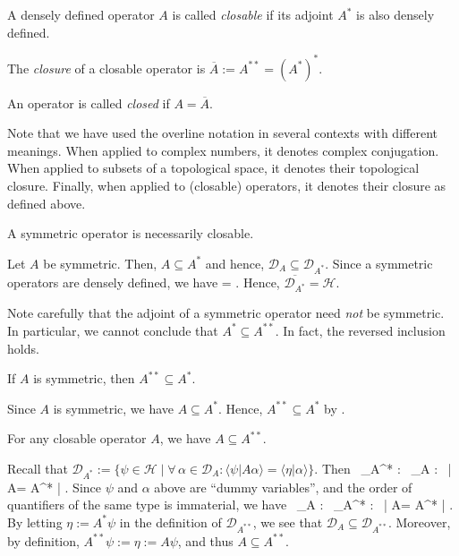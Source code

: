 \bd
\ben[label=(\roman*)]
\item A densely defined operator $A$ is called \emph{closable} if its adjoint $A^*$ is also densely defined.
\item The \emph{closure} of a closable operator is $\overline{A}:=A^{**}=(A^*)^*$.
\item An operator is called \emph{closed} if $A=\overline{A}$.
\een
\ed

\br
Note that we have used the overline notation in several contexts with different meanings. When applied to complex numbers, it denotes complex conjugation. When applied to subsets of a topological space, it denotes their topological closure. Finally, when applied to (closable) operators, it denotes their closure as defined above.
\er

\bp
A symmetric operator is necessarily closable.
\ep

\bq
Let $A$ be symmetric. Then, $A\subseteq A^*$ and hence, $\mathcal{D}_A\subseteq \mathcal{D}_{A^*}$. Since a symmetric operators are densely defined, we have
\bse
{}=\subseteq {} \subseteq {}.
\ese
Hence, $\overline{\mathcal{D}_{A^*}} = \mathcal{H}$.
\eq

Note carefully that the adjoint of a symmetric operator need \emph{not} be symmetric. In particular, we cannot conclude that $A^*\subseteq A^{**}$. In fact, the reversed inclusion holds.

\bp
If $A$ is symmetric, then $A^{**}\subseteq A^*$.
\ep

\bq
Since $A$ is symmetric, we have $A\subseteq A^*$. Hence, $A^{**}\subseteq A^*$ by .
\eq

\bl
\label{lem:closableext}
For any closable operator $A$, we have $A\subseteq A^{**}$.
\el

\bq
Recall that $\mathcal{D}_{A^*}:=\{\psi\in \mathcal{H}\mid \forall\, \alpha\in \mathcal{D}_{A} : \langle \psi | A\alpha \rangle=\langle \eta | \alpha \rangle\}$. Then
\bse
\forall \, \psi \in{}_{A^*} : \forall \, \alpha \in {}_{A} : \  \langle \psi | A\alpha \rangle =  \langle A^* \psi | \alpha \rangle.
\ese
Since $\psi$ and $\alpha$ above are ``dummy variables'', and the order of quantifiers of the same type is immaterial, we have
\bse
\forall \, \psi \in{}_{A} : \forall \, \alpha \in {}_{A^*} : \  \langle \alpha | A\psi \rangle =  \langle A^* \alpha | \psi \rangle.
\ese
By letting $\eta:=A^*\psi$ in the definition of $\mathcal{D}_{A^{**}}$, we see that $\mathcal{D}_{A}\subseteq\mathcal{D}_{A^{**}}$. Moreover, by definition, $A^{**}\psi:=\eta := A\psi$, and thus $A\subseteq A^{**}$.
\eq

